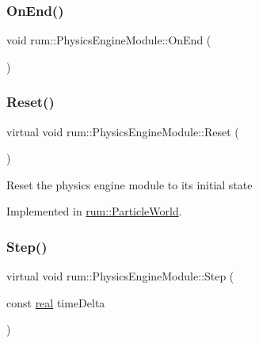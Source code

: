 \subsubsection{\texorpdfstring{On\+End()}{OnEnd()}}
{\footnotesize\ttfamily void rum\+::\+Physics\+Engine\+Module\+::\+On\+End (\begin{DoxyParamCaption}{ }\end{DoxyParamCaption})\hspace{0.3cm}{\ttfamily [virtual]}}

\mbox{\label{classrum_1_1_physics_engine_module_a1ee77a3a48ced8291a86506e6904ca9e}} 
\subsubsection{\texorpdfstring{Reset()}{Reset()}}
{\footnotesize\ttfamily virtual void rum\+::\+Physics\+Engine\+Module\+::\+Reset (\begin{DoxyParamCaption}{ }\end{DoxyParamCaption})\hspace{0.3cm}{\ttfamily [pure virtual]}}

Reset the physics engine module to its initial state 

Implemented in \hyperlink{classrum_1_1_particle_world_ab30292cabe306715e49b5234abff1f3c}{rum\+::\+Particle\+World}.

\mbox{\label{classrum_1_1_physics_engine_module_a0c8bfcf27aee16f05ef9a83948f330ac}} 
\subsubsection{\texorpdfstring{Step()}{Step()}}
{\footnotesize\ttfamily virtual void rum\+::\+Physics\+Engine\+Module\+::\+Step (\begin{DoxyParamCaption}\item[{const \hyperlink{namespacerum_a7e8cca23573d5eaead0f138cbaa4862c}{real}}]{time\+Delta }\end{DoxyParamCaption})\hspace{0.3cm}{\ttfamily [pure virtual]}}

